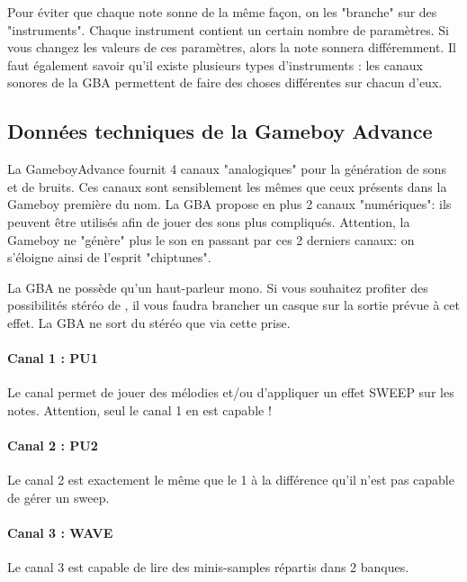 \documentclass[12pt,a4paper]{article}
\begin{document}
    Pour éviter que chaque note sonne de la même façon, on les "branche" sur des "instruments". Chaque instrument contient un certain nombre de paramètres. Si vous changez les valeurs de ces paramètres, alors la note sonnera différemment. Il faut également savoir qu'il existe plusieurs types d'instruments : les canaux sonores de la GBA permettent de faire des choses différentes sur chacun d'eux.
    
    \subsection{Données techniques de la Gameboy Advance}
    
    La GameboyAdvance fournit 4 canaux "analogiques" pour la génération de sons et de bruits. Ces canaux sont sensiblement les mêmes que ceux présents dans la Gameboy première du nom. La GBA propose en plus 2 canaux "numériques": ils peuvent être utilisés afin de jouer des sons plus compliqués. Attention, la Gameboy ne "génère" plus le son en passant par ces 2 derniers canaux: on s'éloigne ainsi de l'esprit "chiptunes".
    
    La GBA ne possède qu'un haut-parleur mono. Si vous souhaitez profiter des possibilités stéréo de \FAT, il vous faudra brancher un casque sur la sortie prévue à cet effet. La GBA ne sort du stéréo que via cette prise.
    
        \paragraph{Canal 1 : PU1} Le canal permet de jouer des mélodies et/ou d'appliquer un effet SWEEP sur les notes. Attention, seul le canal 1 en est capable ! 
        
        
        \paragraph{Canal 2 : PU2} Le canal 2 est exactement le même que le 1 à la différence qu'il n'est pas capable de gérer un sweep.
        
        
        \paragraph{Canal 3 : WAVE} Le canal 3 est capable de lire des minis-samples répartis dans 2 banques. 
        
\end{document}
